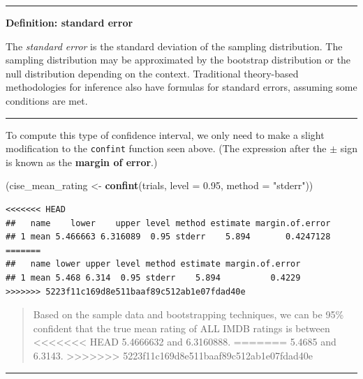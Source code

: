 \documentclass[]{tufte-book}
\newenvironment{Shaded}{\begin{snugshade}}{\end{snugshade}}
\newcommand{\KeywordTok}[1]{\textcolor[rgb]{0.13,0.29,0.53}{\textbf{{#1}}}}
\newcommand{\DataTypeTok}[1]{\textcolor[rgb]{0.13,0.29,0.53}{{#1}}}
\newcommand{\FloatTok}[1]{\textcolor[rgb]{0.00,0.00,0.81}{{#1}}}
\newcommand{\StringTok}[1]{\textcolor[rgb]{0.31,0.60,0.02}{{#1}}}
\newcommand{\NormalTok}[1]{{#1}}
\let\oldrule=\rule
\renewcommand{\rule}[1]{\oldrule{\linewidth}}
\begin{document}
\begin{center}\rule{0.5\linewidth}{\linethickness}\end{center}

\textbf{Definition: standard error}

The \emph{standard error} is the standard deviation of the sampling
distribution. The sampling distribution may be approximated by the
bootstrap distribution or the null distribution depending on the
context. Traditional theory-based methodologies for inference also have
formulas for standard errors, assuming some conditions are met.

\begin{center}\rule{0.5\linewidth}{\linethickness}\end{center}

To compute this type of confidence interval, we only need to make a
slight modification to the \texttt{confint} function seen above. (The
expression after the \(\pm\) sign is known as the \textbf{margin of
error}.)

\begin{Shaded}
\begin{Highlighting}[]
\NormalTok{(cise_mean_rating <-}\StringTok{ }\KeywordTok{confint}\NormalTok{(trials, }\DataTypeTok{level =} \FloatTok{0.95}\NormalTok{, }\DataTypeTok{method =} \StringTok{"stderr"}\NormalTok{))}
\end{Highlighting}
\end{Shaded}

\begin{verbatim}
<<<<<<< HEAD
##   name    lower    upper level method estimate margin.of.error
## 1 mean 5.466663 6.316089  0.95 stderr    5.894       0.4247128
=======
##   name lower upper level method estimate margin.of.error
## 1 mean 5.468 6.314  0.95 stderr    5.894          0.4229
>>>>>>> 5223f11c169d8e511baaf89c512ab1e07fdad40e
\end{verbatim}

\begin{quote}
Based on the sample data and bootstrapping techniques, we can be 95\%
confident that the true mean rating of ALL IMDB ratings is between
<<<<<<< HEAD
5.4666632 and 6.3160888.
=======
5.4685 and 6.3143.
>>>>>>> 5223f11c169d8e511baaf89c512ab1e07fdad40e
\end{quote}

\begin{center}\rule{0.5\linewidth}{\linethickness}\end{center}
\end{document}
